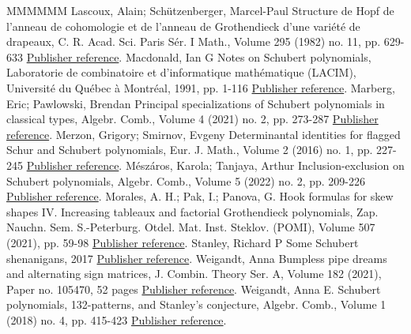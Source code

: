\begin{thebibliography}{MMMMMM}
 Lascoux, Alain; Schützenberger, Marcel-Paul Structure de Hopf de l’anneau de cohomologie et de l’anneau de Grothendieck d’une variété de drapeaux, C. R. Acad. Sci. Paris Sér. I Math., Volume 295 (1982) no. 11, pp. 629-633 \href{https://alco.centre-mersenne.org/articles/10.5802/alco.422/#LS82b}{Publisher reference}.
 Macdonald, Ian G Notes on Schubert polynomials, Laboratorie de combinatoire et d’informatique mathématique (LACIM), Université du Québec à Montréal, 1991, pp. 1-116 \href{https://alco.centre-mersenne.org/articles/10.5802/alco.422/#Mac91}{Publisher reference}.
 Marberg, Eric; Pawlowski, Brendan Principal specializations of Schubert polynomials in classical types, Algebr. Comb., Volume 4 (2021) no. 2, pp. 273-287 \href{https://alco.centre-mersenne.org/articles/10.5802/alco.422/#MP21}{Publisher reference}.
 Merzon, Grigory; Smirnov, Evgeny Determinantal identities for flagged Schur and Schubert polynomials, Eur. J. Math., Volume 2 (2016) no. 1, pp. 227-245 \href{https://alco.centre-mersenne.org/articles/10.5802/alco.422/#MS16}{Publisher reference}.
 Mészáros, Karola; Tanjaya, Arthur Inclusion-exclusion on Schubert polynomials, Algebr. Comb., Volume 5 (2022) no. 2, pp. 209-226 \href{https://alco.centre-mersenne.org/articles/10.5802/alco.422/#MT22}{Publisher reference}.
 Morales, A. H.; Pak, I.; Panova, G. Hook formulas for skew shapes IV. Increasing tableaux and factorial Grothendieck polynomials, Zap. Nauchn. Sem. S.-Peterburg. Otdel. Mat. Inst. Steklov. (POMI), Volume 507 (2021), pp. 59-98 \href{https://alco.centre-mersenne.org/articles/10.5802/alco.422/#MPP22}{Publisher reference}.
 Stanley, Richard P Some Schubert shenanigans, 2017 \href{https://alco.centre-mersenne.org/articles/10.5802/alco.422/#Sta17}{Publisher reference}.
 Weigandt, Anna Bumpless pipe dreams and alternating sign matrices, J. Combin. Theory Ser. A, Volume 182 (2021), Paper no. 105470, 52 pages \href{https://alco.centre-mersenne.org/articles/10.5802/alco.422/#Wei21}{Publisher reference}.
 Weigandt, Anna E. Schubert polynomials, 132-patterns, and Stanley’s conjecture, Algebr. Comb., Volume 1 (2018) no. 4, pp. 415-423 \href{https://alco.centre-mersenne.org/articles/10.5802/alco.422/#Wei18}{Publisher reference}.
\end{thebibliography}
